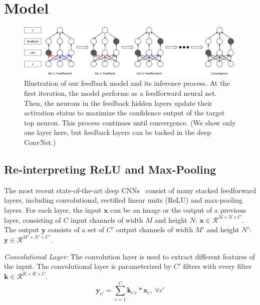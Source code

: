 \section{Model}
\label{sec:model}

\setlength{\tabcolsep}{2pt}
\begin{figure}
\begin{center}
\includegraphics[width=\linewidth]{figs/model/model}
\caption{Illustration of our feedback model and its inference process. At the first iteration, the model performs as a feedforward neural net. Then, the neurons in the feedback hidden layers update their activation status to maximize the confidence output of the target top neuron. This process continues until convergence. (We show only one layer here, but feedback layers can be tacked in the deep ConvNet.)}
\label{fig:model}
\end{center}
\end{figure}


\subsection{Re-interpreting ReLU and Max-Pooling}
The most recent state-of-the-art deep CNNs~\cite{Simonyan2014Very} consist of many stacked feedforward layers, including convolutional, rectified linear units (ReLU) and max-pooling layers. For each layer, the input $\mathbf{x}$ can be an image or the output of a previous layer, consisting of $C$ input channels of width $M$ and height $N$: $\mathbf{x} \in \mathcal{R}^{M \times N \times C}$. The output $\mathbf{y}$ consists of a set of $C'$ output channels of width $M'$ and height $N'$: $\mathbf{y} \in \mathcal{R}^{M' \times N' \times C'}$.

\emph{Convolutional Layer:}
The convolution layer is used to extract different features of the input. The convolutional layer is parameterized by $C'$ filters with every filter $\mathbf{k} \in \mathcal{R}^{K \times K \times C}$.
\begin{equation}
\mathbf{y}_{c'} = \sum_{c=1}^C \mathbf{k}_{c'c} * \mathbf{x}_c,\ \forall c'
\end{equation}

